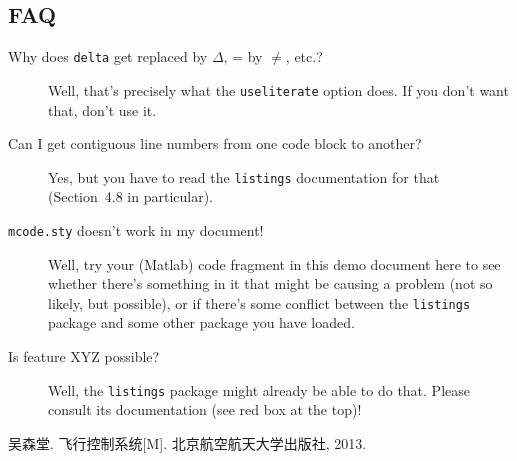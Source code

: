 \documentclass{sysureport}
\begin{document}
\subsection{FAQ}

\begin{description}
	\item[Why does {\tt delta} get replaced by $\Delta$, {\selectfont\texttildelow=} by $\neq$, etc.?]
		Well, that's precisely what the \verb|useliterate| option does. If you don't want that, don't use it.
	\item[Can I get contiguous line numbers from one code block to another?]
		Yes, but you have to read the \verb|listings| documentation for that (Section~4.8 in particular).
	\item[{\tt mcode.sty} doesn't work in my document!] Well, try your (Matlab) code fragment in this demo document here to see whether there's something in it that might be causing a problem (not so likely, but possible), or if there's some conflict between the \verb|listings| package and some other package you have loaded.
	\item[Is feature XYZ possible?] Well, the \verb|listings| package might already be able to do that. Please consult its documentation (see red box at the top)!
\end{description}


\begin{thebibliography}{99}
 吴森堂. 飞行控制系统[M]. 北京航空航天大学出版社, 2013.
\end{thebibliography}
\end{document}
